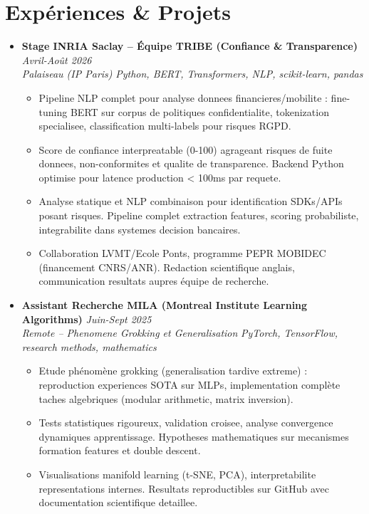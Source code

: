 \documentclass[a4paper,11pt]{article}
\begin{document}
\section{Exp\'eriences \& Projets}
\begin{itemize}[leftmargin=*, label={-}]

\item \textbf{Stage INRIA Saclay -- \'Equipe TRIBE (Confiance \& Transparence)} \hfill \textit{Avril-Ao\^ut 2026} \\
\textit{Palaiseau (IP Paris)} \hfill \textit{Python, BERT, Transformers, NLP, scikit-learn, pandas}
\vspace{-2pt}
    \begin{itemize}[leftmargin=0.4cm, nosep, label=\tiny$\bullet$]
        \item \small{Pipeline NLP complet pour analyse donnees financieres/mobilite : fine-tuning BERT sur corpus de politiques confidentialite, tokenization specialisee, classification multi-labels pour risques RGPD.}
        \item \small{Score de confiance interpreatable (0-100) agrageant risques de fuite donnees, non-conformites et qualite de transparence. Backend Python optimise pour latence production < 100ms par requete.}
        \item \small{Analyse statique et NLP combinaison pour identification SDKs/APIs posant risques. Pipeline complet extraction features, scoring probabiliste, integrabilite dans systemes decision bancaires.}
        \item \small{Collaboration LVMT/Ecole Ponts, programme PEPR MOBIDEC (financement CNRS/ANR). Redaction scientifique anglais, communication resultats aupres équipe de recherche.}
    \end{itemize}
\vspace{3pt}

\item \textbf{Assistant Recherche MILA (Montreal Institute Learning Algorithms)} \hfill \textit{Juin-Sept 2025} \\
\textit{Remote -- Phenomene Grokking et Generalisation} \hfill \textit{PyTorch, TensorFlow, research methods, mathematics}
\vspace{-2pt}
    \begin{itemize}[leftmargin=0.4cm, nosep, label=\tiny$\bullet$]
        \item \small{Etude phénomène grokking (generalisation tardive extreme) : reproduction experiences SOTA sur MLPs, implementation complète taches algebriques (modular arithmetic, matrix inversion).}
        \item \small{Tests statistiques rigoureux, validation croisee, analyse convergence dynamiques apprentissage. Hypotheses mathematiques sur mecanismes formation features et double descent.}
        \item \small{Visualisations manifold learning (t-SNE, PCA), interpretabilite representations internes. Resultats reproductibles sur GitHub avec documentation scientifique detaillee.}
    \end{itemize}
\vspace{3pt}


\end{itemize}
\end{document}
